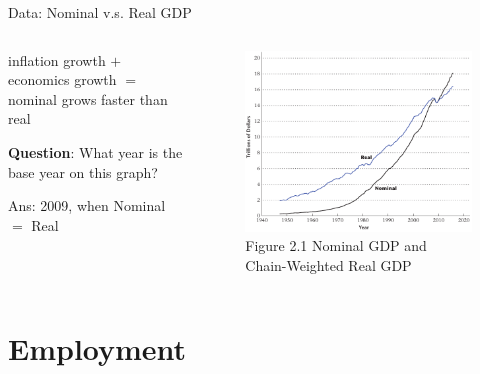 \documentclass[11pt,aspectratio=169,usenames,dvipsnames]{beamer}
\let\tempone\itemize
\let\temptwo\enditemize
\renewenvironment{itemize}{\tempone\addtolength{\itemsep}{\fill}}{\temptwo}
\begin{document}
\begin{frame}{Data: Nominal v.s. Real GDP}
\label{slide:Data__Nominal_v_s__Real_GDP}
    \begin{columns}
        \begin{column}{0.4\textwidth}
            \begin{itemize}
                \item inflation growth $ + $ economics growth $ = $ nominal grows faster than real
                \item \textbf{Question}: \alert{What year is the base year} on this graph?
                \item Ans: 2009, when Nominal $ = $ Real
            \end{itemize}
        \end{column}
        \begin{column}{0.6\textwidth}
            \begin{figure}
                \caption{Figure 2.1 Nominal GDP and Chain-Weighted Real GDP}
                \includegraphics[width=.9\textwidth]{./figures/Figure2_1.png}
            \end{figure}
        \end{column}
    \end{columns}
\end{frame}

\section{Employment}
\label{sec:Employment}
\end{document}

